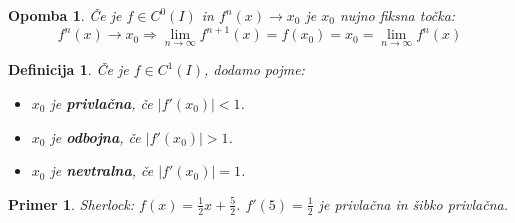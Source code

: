 \documentclass{article}
\newtheorem{definicija}{Definicija}
\newtheorem{opomba}{Opomba}
\newtheorem{primer}{Primer}
\begin{document}
\begin{opomba}
Če je $f \in C^0(I)$ in $f^n(x) \rightarrow x_0$ je $x_0$ nujno fiksna točka:
$$
f^n(x) \rightarrow x_0 \Longrightarrow \lim_{n\rightarrow \infty} f^{n+1}(x)= f(x_0) = x_0 = 
\lim_{n\rightarrow \infty} f^n(x)
$$
\end{opomba}

\begin{definicija}
Če je $f \in C^1(I)$, dodamo pojme:
\begin{itemize}
\item $x_0$ je \textbf{privlačna}, če $|f'(x_0)| < 1$.
\item $x_0$ je \textbf{odbojna}, če $|f'(x_0)| > 1$.
\item $x_0$ je \textbf{nevtralna}, če $|f'(x_0)| = 1$.
\end{itemize} 
\end{definicija}

\begin{primer}
Sherlock: $f(x) = \frac{1}{2}x + \frac{5}{2}$.
$f'(5) = \frac{1}{2}$ je privlačna in šibko privlačna.
\end{primer}
\end{document}
